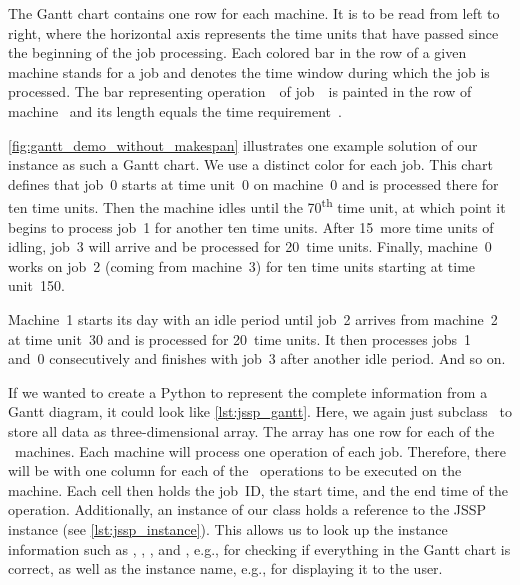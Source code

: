 The Gantt chart contains one row for each machine.
It is to be read from left to right, where the horizontal axis represents the time units that have passed since the beginning of the job processing.
Each colored bar in the row of a given machine stands for a job and denotes the time window during which the job is processed.
The bar representing operation~\jsspMachineIndex\ of job~\jsspJobIndex\ is painted in the row of machine~\jsspOperationMachine{\jsspJobIndex}{\jsspMachineIndex} and its length equals the time requirement~\jsspOperationTime{\jsspJobIndex}{\jsspMachineIndex}.

\autoref{fig:gantt_demo_without_makespan} illustrates one example solution of our  instance as such a Gantt chart.
We use a distinct color for each job.
This chart defines that job~0 starts at time unit~0 on machine~0 and is processed there for ten time units.
Then the machine idles until the 70\textsuperscript{th} time unit, at which point it begins to process job~1 for another ten time units.
After 15~more time units of idling, job~3 will arrive and be processed for 20~time units.
Finally, machine~0 works on job~2 (coming from machine~3) for ten time units starting at time unit~150.

Machine~1 starts its day with an idle period until job~2 arrives from machine~2 at time unit~30 and is processed for 20~time units.
It then processes jobs~1 and~0 consecutively and finishes with job~3 after another idle period.
And so on.

If we wanted to create a Python  to represent the complete information from a Gantt diagram, it could look like \autoref{lst:jssp_gantt}.
Here, we again just subclass \numpyndarray\ to store all data as three-dimensional array.
The array has one row for each of the \jsspMachines~machines.
Each machine will process one operation of each job.
Therefore, there will be with one column for each of the \jsspJobs~operations to be executed on the machine.
Each cell then holds the job~ID, the start time, and the end time of the operation.
Additionally, an instance of our  class holds a reference to the \gls{JSSP} instance (see \autoref{lst:jssp_instance}).
This allows us to look up the instance information such as \jsspJobs, \jsspMachines, \jsspOperationMachineMat, and \jsspOperationTimeMat, e.g., for checking if everything in the Gantt chart is correct, as well as the instance name, e.g., for displaying it to the user.

%
%


